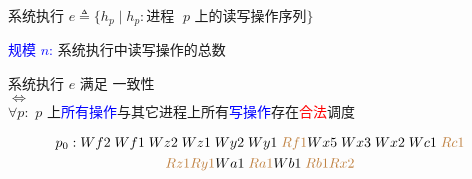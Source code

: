 \begin{frame}{}
  \begin{cdef}[系统执行]
    系统执行 $e \triangleq \{h_p \mid h_p: \text{进程 } \;p \text{ 上的读写操作序列}\}$

    \vspace{0.30cm}
    \textcolor{blue}{规模 $n$:} 系统执行中读写操作的总数
  \end{cdef}

  \vspace{0.50cm}
\end{frame}

\begin{frame}{}
  \begin{cdef}
    \begin{center}
      系统执行 $e$ 满足 \emph{\PRAM{}} 一致性 \\[5pt]
      $\iff$ \\[5pt]
      $\forall p:$ $p$ 上\textcolor{blue}{所有操作}与其它进程上所有\textcolor{blue}{写操作}存在\textcolor{red}{合法}调度
    \end{center}
  \end{cdef}

  \vspace{0.30cm}

  \pause
  \vspace{-0.80cm}

  \begin{gather*}
    p_{0}: Wf2\; Wf1\; Wz2\; Wz1\; Wy2\; Wy1\; \textcolor{brown}{Rf1} 
    Wx5\; Wx3\; Wx2\; Wc1\; \textcolor{brown}{Rc1} \\
    \textcolor{brown}{Rz1} \textcolor{brown}{Ry1}
    Wa1\; \textcolor{brown}{Ra1} Wb1\; \textcolor{brown}{Rb1} \textcolor{brown}{Rx2}
  \end{gather*}
\end{frame}

